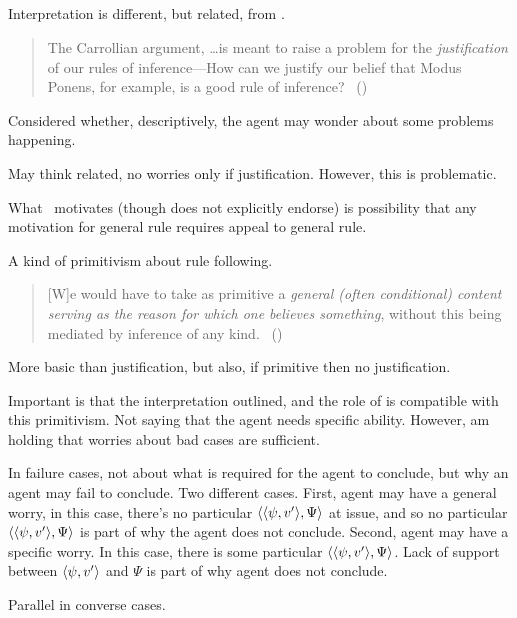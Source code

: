 \subsection{\textcite{Boghossian:2008vf}}

\begin{note}
  Interpretation is different, but related, from \textcite{Boghossian:2008vf}.

  \begin{quote}
    The Carrollian argument, \dots is meant to raise a problem for the \emph{justification} of our rules of inference---How can we justify our belief that Modus Ponens, for example, is a good rule of inference?\newline
    \mbox{ }\hfill\mbox{(\citeyear[493]{Boghossian:2008vf})}
  \end{quote}

  Considered whether, descriptively, the agent may wonder about some problems happening.

  May think related, no worries only if justification.
  However, this is problematic.

  What~\textcite{Boghossian:2008vf} motivates (though does not explicitly endorse) is possibility that any motivation for general rule requires appeal to general rule.

  A kind of primitivism about rule following.
  \begin{quote}
    [W]e would have to take as primitive a \emph{general (often conditional) content serving as the reason for which one believes something}, without this being mediated by inference of any kind.%
    \mbox{ }\hfill\mbox{(\citeyear[500]{Boghossian:2008vf})}
  \end{quote}

  More basic than justification, but also, if primitive then no justification.

  Important is that the interpretation outlined, and the role of \qzS{} is compatible with this primitivism.
  Not saying that the agent needs specific ability.
  However, am holding that worries about bad cases are sufficient.

  In failure cases, not about what is required for the agent to conclude, but why an agent may fail to conclude.
  Two different cases.
  First, agent may have a general worry, in this case, there's no particular \(\langle \langle \psi, v' \rangle, \Psi \rangle\) at issue, and so no particular \(\langle \langle \psi, v' \rangle, \Psi \rangle\) is part of why the agent does not conclude.
  Second, agent may have a specific worry.
  In this case, there is some particular \(\langle \langle \psi, v' \rangle, \Psi \rangle\).
  Lack of support between \(\langle \psi, v' \rangle\) and \(\Psi\) is part of why agent does not conclude.

  Parallel in converse cases.
\end{note}

